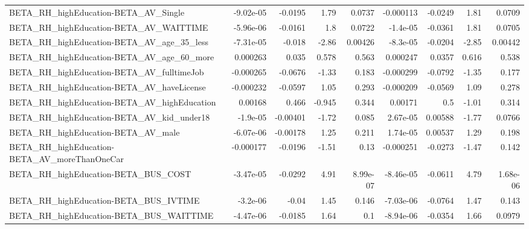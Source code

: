 \begin{tabular}{lrrrrrrrr}
BETA\_RH\_highEducation-BETA\_AV\_Single               &   -9.02e-05 &      -0.0195 &      1.79 &   0.0737 &  -0.000113 &     -0.0249 &         1.81 &        0.0709 \\
BETA\_RH\_highEducation-BETA\_AV\_WAITTIME             &   -5.96e-06 &      -0.0161 &       1.8 &   0.0722 &   -1.4e-05 &     -0.0361 &         1.81 &        0.0705 \\
BETA\_RH\_highEducation-BETA\_AV\_age\_35\_less          &   -7.31e-05 &       -0.018 &     -2.86 &  0.00426 &   -8.3e-05 &     -0.0204 &        -2.85 &       0.00442 \\
BETA\_RH\_highEducation-BETA\_AV\_age\_60\_more          &    0.000263 &        0.035 &     0.578 &    0.563 &   0.000247 &      0.0357 &        0.616 &         0.538 \\
BETA\_RH\_highEducation-BETA\_AV\_fulltimeJob          &   -0.000265 &      -0.0676 &     -1.33 &    0.183 &  -0.000299 &     -0.0792 &        -1.35 &         0.177 \\
BETA\_RH\_highEducation-BETA\_AV\_haveLicense          &   -0.000232 &      -0.0597 &      1.05 &    0.293 &  -0.000209 &     -0.0569 &         1.09 &         0.278 \\
BETA\_RH\_highEducation-BETA\_AV\_highEducation        &     0.00168 &        0.466 &    -0.945 &    0.344 &    0.00171 &         0.5 &        -1.01 &         0.314 \\
BETA\_RH\_highEducation-BETA\_AV\_kid\_under18          &    -1.9e-05 &     -0.00401 &     -1.72 &    0.085 &   2.67e-05 &     0.00588 &        -1.77 &        0.0766 \\
BETA\_RH\_highEducation-BETA\_AV\_male                 &   -6.07e-06 &     -0.00178 &      1.25 &    0.211 &   1.74e-05 &     0.00537 &         1.29 &         0.198 \\
BETA\_RH\_highEducation-BETA\_AV\_moreThanOneCar       &   -0.000177 &      -0.0196 &     -1.51 &     0.13 &  -0.000251 &     -0.0273 &        -1.47 &         0.142 \\
BETA\_RH\_highEducation-BETA\_BUS\_COST                &   -3.47e-05 &      -0.0292 &      4.91 & 8.99e-07 &  -8.46e-05 &     -0.0611 &         4.79 &      1.68e-06 \\
BETA\_RH\_highEducation-BETA\_BUS\_IVTIME              &    -3.2e-06 &        -0.04 &      1.45 &    0.146 &  -7.03e-06 &     -0.0764 &         1.47 &         0.143 \\
BETA\_RH\_highEducation-BETA\_BUS\_WAITTIME            &   -4.47e-06 &      -0.0185 &      1.64 &      0.1 &  -8.94e-06 &     -0.0354 &         1.66 &        0.0979 \\

\end{tabular}
